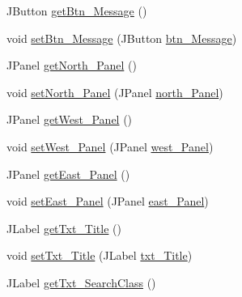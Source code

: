 \begin{DoxyCompactItemize}
\item 
J\+Button \mbox{\hyperlink{classcom_1_1_b_n_u_1_1pages_1_1main_1_1_main_model_a90fbbc599ae76f6b1c8b7336ef6c274d}{get\+Btn\+\_\+\+Message}} ()
\item 
void \mbox{\hyperlink{classcom_1_1_b_n_u_1_1pages_1_1main_1_1_main_model_a6586659b8f70f7b4d77cfc9f98160209}{set\+Btn\+\_\+\+Message}} (J\+Button \mbox{\hyperlink{classcom_1_1_b_n_u_1_1pages_1_1main_1_1_main_model_af7e3b991afa64d4ff4be1b42f009d329}{btn\+\_\+\+Message}})
\item 
J\+Panel \mbox{\hyperlink{classcom_1_1_b_n_u_1_1pages_1_1main_1_1_main_model_a2699ca4e2edee621b6ededa2a3295482}{get\+North\+\_\+\+Panel}} ()
\item 
void \mbox{\hyperlink{classcom_1_1_b_n_u_1_1pages_1_1main_1_1_main_model_a0e719d7fa4781770cc8d8caa645d1e89}{set\+North\+\_\+\+Panel}} (J\+Panel \mbox{\hyperlink{classcom_1_1_b_n_u_1_1pages_1_1main_1_1_main_model_af25da6623245f08c0488f548694eccdf}{north\+\_\+\+Panel}})
\item 
J\+Panel \mbox{\hyperlink{classcom_1_1_b_n_u_1_1pages_1_1main_1_1_main_model_a51ff5ccf5ccbd58c502bd3cc46f70379}{get\+West\+\_\+\+Panel}} ()
\item 
void \mbox{\hyperlink{classcom_1_1_b_n_u_1_1pages_1_1main_1_1_main_model_a50b875d1c2e70207e07970ceb47cfca7}{set\+West\+\_\+\+Panel}} (J\+Panel \mbox{\hyperlink{classcom_1_1_b_n_u_1_1pages_1_1main_1_1_main_model_ab47d8a4899e911ca0cea0a15c7eb6278}{west\+\_\+\+Panel}})
\item 
J\+Panel \mbox{\hyperlink{classcom_1_1_b_n_u_1_1pages_1_1main_1_1_main_model_a845ac15aa31188be12b6ac402be90604}{get\+East\+\_\+\+Panel}} ()
\item 
void \mbox{\hyperlink{classcom_1_1_b_n_u_1_1pages_1_1main_1_1_main_model_a5357cd6758a3ef4bbf7f0aa5e16c1038}{set\+East\+\_\+\+Panel}} (J\+Panel \mbox{\hyperlink{classcom_1_1_b_n_u_1_1pages_1_1main_1_1_main_model_a46bba40d2a6a7e6940cd1b8081ce343e}{east\+\_\+\+Panel}})
\item 
J\+Label \mbox{\hyperlink{classcom_1_1_b_n_u_1_1pages_1_1main_1_1_main_model_a0176a854270be838c626f399739763f5}{get\+Txt\+\_\+\+Title}} ()
\item 
void \mbox{\hyperlink{classcom_1_1_b_n_u_1_1pages_1_1main_1_1_main_model_a8b72eeb8ad9f1b7d54005b8cc7640dab}{set\+Txt\+\_\+\+Title}} (J\+Label \mbox{\hyperlink{classcom_1_1_b_n_u_1_1pages_1_1main_1_1_main_model_aeec023ac543ff319a137e43686bf6016}{txt\+\_\+\+Title}})
\item 
J\+Label \mbox{\hyperlink{classcom_1_1_b_n_u_1_1pages_1_1main_1_1_main_model_a8b08a80c41b761337aa6fe2fbdfb0386}{get\+Txt\+\_\+\+Search\+Class}} ()

\end{DoxyCompactItemize}
